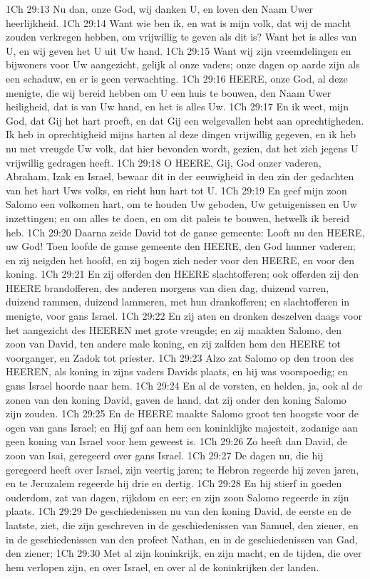 1Ch 29:13  Nu dan, onze God, wij danken U, en loven den Naam Uwer heerlijkheid.
1Ch 29:14  Want wie ben ik, en wat is mijn volk, dat wij de macht zouden verkregen hebben, om vrijwillig te geven als dit is? Want het is alles van U, en wij geven het U uit Uw hand.
1Ch 29:15  Want wij zijn vreemdelingen en bijwoners voor Uw aangezicht, gelijk al onze vaders; onze dagen op aarde zijn als een schaduw, en er is geen verwachting.
1Ch 29:16  HEERE, onze God, al deze menigte, die wij bereid hebben om U een huis te bouwen, den Naam Uwer heiligheid, dat is van Uw hand, en het is alles Uw.
1Ch 29:17  En ik weet, mijn God, dat Gij het hart proeft, en dat Gij een welgevallen hebt aan oprechtigheden. Ik heb in oprechtigheid mijns harten al deze dingen vrijwillig gegeven, en ik heb nu met vreugde Uw volk, dat hier bevonden wordt, gezien, dat het zich jegens U vrijwillig gedragen heeft.
1Ch 29:18  O HEERE, Gij, God onzer vaderen, Abraham, Izak en Israel, bewaar dit in der eeuwigheid in den zin der gedachten van het hart Uws volks, en richt hun hart tot U.
1Ch 29:19  En geef mijn zoon Salomo een volkomen hart, om te houden Uw geboden, Uw getuigenissen en Uw inzettingen; en om alles te doen, en om dit paleis te bouwen, hetwelk ik bereid heb.
1Ch 29:20  Daarna zeide David tot de ganse gemeente: Looft nu den HEERE, uw God! Toen loofde de ganse gemeente den HEERE, den God hunner vaderen; en zij neigden het hoofd, en zij bogen zich neder voor den HEERE, en voor den koning.
1Ch 29:21  En zij offerden den HEERE slachtofferen; ook offerden zij den HEERE brandofferen, des anderen morgens van dien dag, duizend varren, duizend rammen, duizend lammeren, met hun drankofferen; en slachtofferen in menigte, voor gans Israel.
1Ch 29:22  En zij aten en dronken deszelven daags voor het aangezicht des HEEREN met grote vreugde; en zij maakten Salomo, den zoon van David, ten andere male koning, en zij zalfden hem den HEERE tot voorganger, en Zadok tot priester.
1Ch 29:23  Alzo zat Salomo op den troon des HEEREN, als koning in zijns vaders Davids plaats, en hij was voorspoedig; en gans Israel hoorde naar hem.
1Ch 29:24  En al de vorsten, en helden, ja, ook al de zonen van den koning David, gaven de hand, dat zij onder den koning Salomo zijn zouden.
1Ch 29:25  En de HEERE maakte Salomo groot ten hoogste voor de ogen van gans Israel; en Hij gaf aan hem een koninklijke majesteit, zodanige aan geen koning van Israel voor hem geweest is.
1Ch 29:26  Zo heeft dan David, de zoon van Isai, geregeerd over gans Israel.
1Ch 29:27  De dagen nu, die hij geregeerd heeft over Israel, zijn veertig jaren; te Hebron regeerde hij zeven jaren, en te Jeruzalem regeerde hij drie en dertig.
1Ch 29:28  En hij stierf in goeden ouderdom, zat van dagen, rijkdom en eer; en zijn zoon Salomo regeerde in zijn plaats.
1Ch 29:29  De geschiedenissen nu van den koning David, de eerste en de laatste, ziet, die zijn geschreven in de geschiedenissen van Samuel, den ziener, en in de geschiedenissen van den profeet Nathan, en in de geschiedenissen van Gad, den ziener;
1Ch 29:30  Met al zijn koninkrijk, en zijn macht, en de tijden, die over hem verlopen zijn, en over Israel, en over al de koninkrijken der landen.



